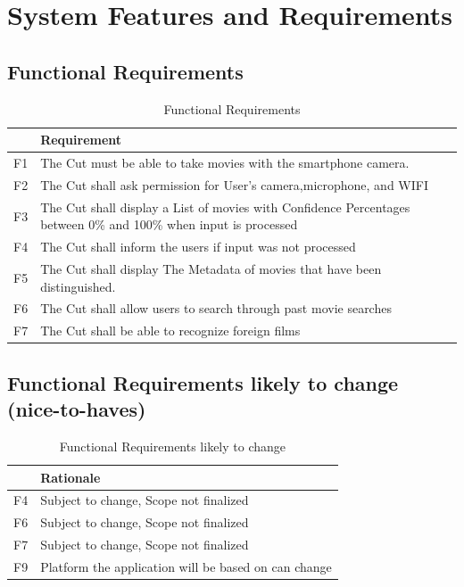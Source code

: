 \documentclass[titlepage]{article}
\begin{document}
\section{System Features and Requirements}

\subsection{Functional Requirements}
\begin{table}[H]
    \centering
    \begin{tabularx}{\textwidth}{|c|X|} \hline
         & \textbf{Requirement} \\ \hline
        F1 & The Cut must be able to take movies with the smartphone camera. \\ \hline
        F2 & The Cut shall ask permission for User's camera,microphone, and WIFI \\ \hline
        F3 & The Cut shall display a List of movies with Confidence Percentages between 0\% and 100\% when input is processed\\ \hline
        F4 & The Cut shall inform the users if input was not processed \\ \hline
        F5 & The Cut shall display The Metadata of movies that have been distinguished. \\ \hline
        F6 & The Cut shall allow users to search through past movie searches \\ \hline
        F7 & The Cut shall be able to recognize foreign films \\ \hline
    \end{tabularx}
    \caption{Functional Requirements}
    \label{tab:Functional}
\end{table}

\subsection{Functional Requirements likely to change (nice-to-haves)}
\begin{table}[H]
    \centering
    \begin{tabularx}{\textwidth}{|c|X|} \hline
         & \textbf{Rationale} \\ \hline
        F4 & Subject to change, Scope not finalized \\ \hline
        F6 & Subject to change, Scope not finalized \\ \hline
        F7 & Subject to change, Scope not finalized \\ \hline
        F9 & Platform the application will be based on can change \\ \hline
    \end{tabularx}
    \caption{Functional Requirements likely to change}
    \label{tab:Functional_likely}
\end{table}
\end{document}
